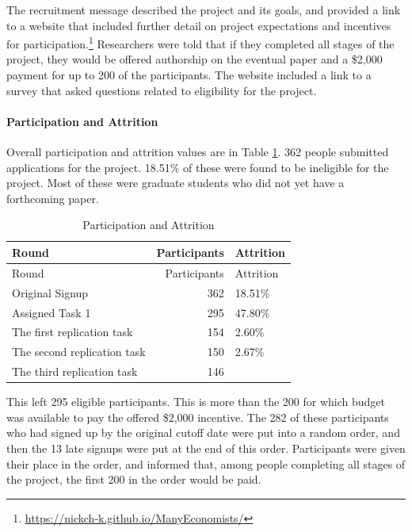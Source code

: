 \documentclass[
  letterpaper,
  DIV=11,
  numbers=noendperiod]{scrartcl}
\let\oldparagraph\paragraph
\renewcommand{\paragraph}[1]{\oldparagraph{#1}\mbox{}}
\begin{document}
The recruitment message described the project and its goals, and
provided a link to a website that included further detail on project
expectations and incentives for participation.\footnote{\url{https://nickch-k.github.io/ManyEconomists/}}
Researchers were told that if they completed all stages of the project,
they would be offered authorship on the eventual paper and a \$2,000
payment for up to 200 of the participants. The website included a link
to a survey that asked questions related to eligibility for the project.

\hypertarget{participation-and-attrition}{%
\paragraph{Participation and
Attrition}\label{participation-and-attrition}}

Overall participation and attrition values are in Table
\ref{tbl-attrition}. 362 people submitted applications for the project.
18.51\% of these were found to be ineligible for the project. Most of
these were graduate students who did not yet have a forthcoming paper.

\hypertarget{tbl-attrition}{}
\begin{longtable}[]{@{}lrl@{}}
\caption{\label{tbl-attrition}Participation and
Attrition}\tabularnewline
\toprule\noalign{}
Round & Participants & Attrition \\
\midrule\noalign{}
\endfirsthead
\toprule\noalign{}
Round & Participants & Attrition \\
\midrule\noalign{}
\endhead
\bottomrule\noalign{}
\endlastfoot
Original Signup & 362 & 18.51\% \\
Assigned Task 1 & 295 & 47.80\% \\
The first replication task & 154 & 2.60\% \\
The second replication task & 150 & 2.67\% \\
The third replication task & 146 & \\
\end{longtable}

This left 295 eligible participants. This is more than the 200 for which
budget was available to pay the offered \$2,000 incentive. The 282 of
these participants who had signed up by the original cutoff date were
put into a random order, and then the 13 late signups were put at the
end of this order. Participants were given their place in the order, and
informed that, among people completing all stages of the project, the
first 200 in the order would be paid.
\end{document}
